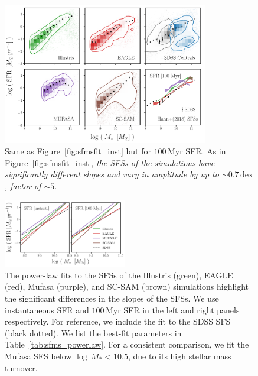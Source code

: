 \documentclass[tighten, preprint]{aastex62}
\begin{document}
\begin{figure}
\begin{center}
\includegraphics[width = 0.8\textwidth]{Catalogs_SFMSfit_SFR100myr.pdf} 
    \caption{Same as Figure~\ref{fig:sfmsfit_inst} but for $100\,\mathrm{Myr}$ SFR. 
    As in Figure~\ref{fig:sfmsfit_inst}, \emph{the SFSs of the simulations 
    have significantly different slopes and vary in amplitude by
    up to ${\sim}0.7\,\mathrm{dex}$, factor of ${\sim}5$}.}\label{fig:sfmsfit_100myr}
\end{center}
\end{figure}

\begin{figure}
\begin{center}
\includegraphics[width = 0.48\textwidth]{Catalogs_SFMS_powerlawfit.pdf} 
\caption{The power-law fits to the SFSs of the Illustris (green), 
    EAGLE (red), {\sc Mufasa} (purple), and SC-SAM (brown) simulations
   	highlight the significant differences in the slopes of the SFSs.
    We use instantaneous SFR and $100\,\mathrm{Myr}$ SFR in the left
    and right panels respectively. For reference, we include the 
    fit to the SDSS SFS (black dotted). We list the best-fit parameters 
    in Table~\ref{tab:sfms_powerlaw}. For a consistent comparison, we 
    fit the {\sc Mufasa} SFS below $\log\,M_* < 10.5$, due to its high stellar mass turnover.} 
    \label{fig:sfmsfit_powerlaw}
\end{center}
\end{figure}
\end{document}

